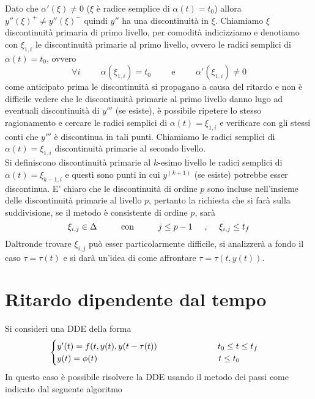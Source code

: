 Dato che $\alpha'(\xi) \ne 0$ ($\xi$ è radice semplice di $\alpha(t)=t_0$) allora $y''(\xi)^+ \ne y''(\xi)^-$ quindi $y''$ ha una discontinuità 
in $\xi$. Chiamiamo $\xi$ discontinuità primaria di primo livello, per comodità indicizziamo e denotiamo con $\xi_{1,i}$ le discontinuità 
primarie al primo livello, ovvero le radici semplici di $\alpha(t)=t_0$, ovvero
$$
\forall i
\hspace{1cm}
\alpha(\xi_{1,i}) = t_0
\hspace{1cm}
\mbox{e}
\hspace{1cm}
\alpha'(\xi_{1,i}) \ne 0
$$
come anticipato prima le discontinuità si propagano a causa del ritardo e non è difficile vedere che le discontinuità primarie 
al primo livello danno lugo ad eventuali discontinuità di $y'''$ (se esiste), è possibile ripetere lo stesso ragionamento e cercare 
le radici semplici di $\alpha(t)=\xi_{1,i}$ e verificare con gli stessi conti che $y'''$ è discontinua in tali punti. 
Chiamiamo le radici semplici di $\alpha(t)=\xi_{1,i}$ discontinuità primarie al secondo livello. \\[0.3cm]
Si definiscono discontinuità primarie al $k$-esimo 
livello le radici semplici di $\alpha(t)=\xi_{k-1,i}$ e questi sono punti in cui $y^{(k+1)}$ (se esiste) potrebbe esser discontinua.
E' chiaro che le discontinuità di ordine $p$ sono incluse nell'insieme delle discontinuità primarie al livello $p$, pertanto 
la richiesta che si farà sulla suddivisione, se il metodo è consistente di ordine $p$, sarà
$$
\xi_{i,j} \in \Delta
\hspace{1cm}
\mbox{con}
\hspace{1cm}
j \le p-1
\hspace{0.5cm}
\mbox{,}
\hspace{0.5cm}
\xi_{i,j} \le t_f
$$
Daltronde trovare $\xi_{i,j}$ può esser particolarmente difficile, si analizzerà a fondo il caso $\tau=\tau(t)$ e si darà un'idea 
di come affrontare $\tau=\tau(t,y(t))$.
\section{Ritardo dipendente dal tempo}
Si consideri una DDE della forma
$$
\begin{cases}
 y'(t) = f(t,y(t),y(t- \tau (t))	\hspace{2.5cm}	t_0 \le t \le t_f \\
 y(t)=\phi(t)				\hspace{5cm}	t \le t_0
\end{cases}
$$
In questo caso è possibile risolvere la DDE usando il metodo dei passi come indicato dal seguente algoritmo


